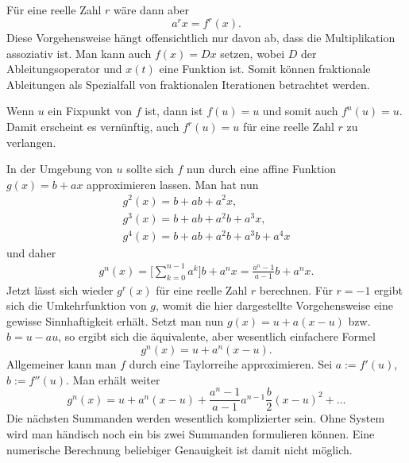 \documentclass[a4paper,11pt,fleqn,twocolumn,twoside]{scrartcl}
\numberwithin{equation}{section}
\begin{document}
Für eine reelle Zahl $r$ wäre dann aber
\begin{equation}
a^r x = f^r(x).
\end{equation}
Diese Vorgehensweise hängt offensichtlich nur davon ab, dass
die Multiplikation assoziativ ist. Man kann auch $f(x)=Dx$ setzen,
wobei $D$ der Ableitungsoperator und $x(t)$ eine Funktion ist.
Somit können fraktionale Ableitungen als Spezialfall von
fraktionalen Iterationen betrachtet werden.

Wenn $u$ ein Fixpunkt von $f$ ist, dann ist $f(u)=u$ und
somit auch $f^n(u)=u$. Damit erscheint es vernünftig, auch
$f^r(u)=u$ für eine reelle Zahl $r$ zu verlangen.

In der Umgebung von $u$ sollte sich $f$ nun durch eine
affine Funktion $g(x)=b+ax$ approximieren lassen. Man hat
nun
\begin{gather*}
g^2(x) = b+ab+a^2x,\\
g^3(x) = b+ab+a^2b+a^3x,\\
g^4(x) = b+ab+a^2b+a^3b+a^4x
\end{gather*}
und daher
\begin{gather*}
g^n(x) = \bigg[\sum_{k=0}^{n-1}a^k\bigg]b+a^nx
= \frac{a^n-1}{a-1}b+a^nx.
\end{gather*}
Jetzt lässt sich wieder $g^r(x)$ für eine reelle Zahl $r$
berechnen. Für $r=-1$ ergibt sich die Umkehrfunktion von $g$,
womit die hier dargestellte Vorgehensweise eine gewisse Sinnhaftigkeit
erhält. Setzt man nun $g(x)=u+a(x-u)$ bzw. $b=u-au$, so ergibt
sich die äquivalente, aber wesentlich einfachere Formel
\begin{equation}
g^n(x) = u+a^n(x-u).
\end{equation}
Allgemeiner kann man $f$ durch eine Taylorreihe approximieren.
Sei $a:=f'(u)$, $b:=f''(u)$. Man erhält weiter
\[g^n(x) = u+a^n(x-u)
+\frac{a^n-1}{a-1}a^{n-1}\frac{b}{2}(x-u)^2+\ldots\]
Die nächsten Summanden werden wesentlich komplizierter sein. Ohne
System wird man händisch noch ein bis zwei Summanden formulieren
können. Eine numerische Berechnung beliebiger Genauigkeit ist damit
nicht möglich.
\end{document}
